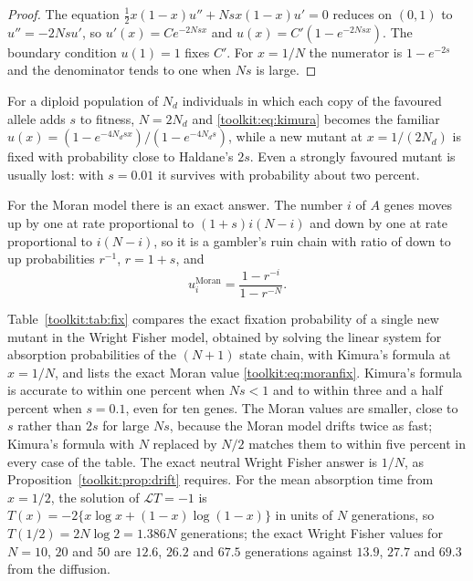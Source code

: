 \begin{proof}
The equation $\tfrac12x(1-x)u''+Nsx(1-x)u'=0$ reduces on $(0,1)$ to $u''=-2Nsu'$, so
$u'(x)=Ce^{-2Nsx}$ and $u(x)=C'(1-e^{-2Nsx})$. The boundary condition $u(1)=1$ fixes $C'$. For
$x=1/N$ the numerator is $1-e^{-2s}$ and the denominator tends to one when $Ns$ is large.
\end{proof}

For a diploid population of $N_d$ individuals in which each copy of the favoured allele adds $s$
to fitness, $N=2N_d$ and \eqref{toolkit:eq:kimura} becomes the familiar
$u(x)=(1-e^{-4N_dsx})/(1-e^{-4N_ds})$, while a new mutant at $x=1/(2N_d)$ is fixed with
probability close to Haldane's $2s$. Even a strongly favoured mutant is usually lost: with
$s=0.01$ it survives with probability about two percent.

For the Moran model there is an exact answer. The number $i$ of $A$ genes moves up by one at rate
proportional to $(1+s)i(N-i)$ and down by one at rate proportional to $i(N-i)$, so it is a
gambler's ruin chain with ratio of down to up probabilities $r^{-1}$, $r=1+s$, and
\begin{equation}\label{toolkit:eq:moranfix}
u^{\mathrm{Moran}}_i=\frac{1-r^{-i}}{1-r^{-N}} .
\end{equation}

\begin{example}\label{toolkit:ex:kimura}
Table~\ref{toolkit:tab:fix} compares the exact fixation probability of a single new mutant in the
Wright Fisher model, obtained by solving the linear system for absorption probabilities of the
$(N+1)$ state chain, with Kimura's formula at $x=1/N$, and lists the exact Moran value
\eqref{toolkit:eq:moranfix}. Kimura's formula is accurate to within one percent when $Ns<1$
and to within three and a half percent when $s=0.1$, even for ten genes. The Moran values are
smaller, close to $s$ rather than $2s$ for large $Ns$, because the Moran model drifts twice as
fast; Kimura's formula with $N$ replaced by $N/2$ matches them to within five percent in every
case of the table. The exact neutral Wright Fisher answer is $1/N$, as
Proposition~\ref{toolkit:prop:drift} requires. For the mean absorption time from $x=1/2$, the
solution of $\mathcal{L}T=-1$ is $T(x)=-2\{x\log x+(1-x)\log(1-x)\}$ in units of $N$ generations,
so $T(1/2)=2N\log2=1.386N$ generations; the exact Wright Fisher values for $N=10$, $20$ and $50$ are $12.6$, $26.2$
and $67.5$ generations against $13.9$, $27.7$ and $69.3$ from the diffusion.
\end{example}

